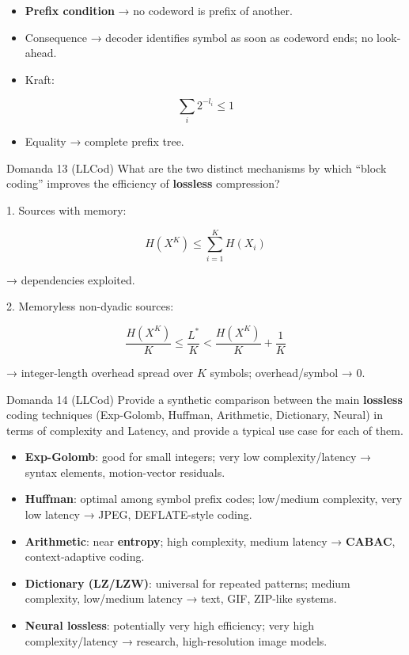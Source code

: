 \begin{itemize}
  \item \textbf{Prefix condition} → no codeword is prefix of another.
  \item Consequence → decoder identifies symbol as soon as codeword ends; no look-ahead.
  \item Kraft:
\end{itemize}


$$
\sum_i 2^{-l_i}\le 1
$$


\begin{itemize}
  \item Equality → complete prefix tree.
\end{itemize}



\begin{questionbox}{Domanda 13}
(LLCod) What are the two distinct mechanisms by which “block coding” improves the efficiency of \textbf{lossless} compression?
\end{questionbox}


1. Sources with memory:


$$
H(X^K) \le \sum_{i=1}^{K}H(X_i)
$$


→ dependencies exploited.

2. Memoryless non-dyadic sources:


$$
\frac{H(X^K)}{K} \le \frac{L^*}{K} < \frac{H(X^K)}{K} + \frac{1}{K}
$$


→ integer-length overhead spread over $K$ symbols; overhead/symbol → $0$.



\begin{questionbox}{Domanda 14}
(LLCod) Provide a synthetic comparison between the main \textbf{lossless} coding techniques (Exp-Golomb, Huffman, Arithmetic, Dictionary, Neural) in terms of complexity and Latency, and provide a typical use case for each of them.
\end{questionbox}


\begin{itemize}
  \item \textbf{Exp-Golomb}: good for small integers; very low complexity/latency → syntax elements, motion-vector residuals.
  \item \textbf{Huffman}: optimal among symbol prefix codes; low/medium complexity, very low latency → JPEG, DEFLATE-style coding.
  \item \textbf{Arithmetic}: near \textbf{entropy}; high complexity, medium latency → \textbf{CABAC}, context-adaptive coding.
  \item \textbf{Dictionary (LZ/LZW)}: universal for repeated patterns; medium complexity, low/medium latency → text, GIF, ZIP-like systems.
  \item \textbf{Neural \textbf{lossless}}: potentially very high efficiency; very high complexity/latency → research, high-resolution image models.
\end{itemize}



